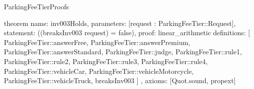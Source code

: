 \begin{lexlean}{ParkingFeeTierProofs}
\begin{semanticmodule}
theorem{
  name: inv003Holds,
  parameters: [request : ParkingFeeTier::Request],
  statement: ((breaksInv003 request) = false),
  proof: linear_arithmetic{
    definitions: [
      ParkingFeeTier::answerFree,
      ParkingFeeTier::answerPremium,
      ParkingFeeTier::answerStandard,
      ParkingFeeTier::judge,
      ParkingFeeTier::rule1,
      ParkingFeeTier::rule2,
      ParkingFeeTier::rule3,
      ParkingFeeTier::rule4,
      ParkingFeeTier::vehicleCar,
      ParkingFeeTier::vehicleMotorcycle,
      ParkingFeeTier::vehicleTruck,
      breaksInv003
    ]
  },
  axioms: [Quot.sound, propext]
}
\end{semanticmodule}
\end{lexlean}
